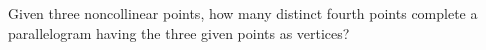 Given three noncollinear points, how many distinct fourth points complete a parallelogram having the three given points as vertices?
